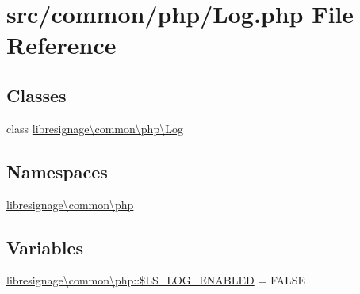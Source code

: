 \hypertarget{Log_8php}{}\section{src/common/php/\+Log.php File Reference}
\label{Log_8php}
\subsection*{Classes}
\begin{DoxyCompactItemize}
\item 
class \hyperlink{classlibresignage_1_1common_1_1php_1_1Log}{libresignage\textbackslash{}common\textbackslash{}php\textbackslash{}\+Log}
\end{DoxyCompactItemize}
\subsection*{Namespaces}
\begin{DoxyCompactItemize}
\item 
 \hyperlink{namespacelibresignage_1_1common_1_1php}{libresignage\textbackslash{}common\textbackslash{}php}
\end{DoxyCompactItemize}
\subsection*{Variables}
\begin{DoxyCompactItemize}
\item 
\hyperlink{namespacelibresignage_1_1common_1_1php_ae62a3a93ad8436552b28e6bda401439a}{libresignage\textbackslash{}common\textbackslash{}php\+::\$\+L\+S\+\_\+\+L\+O\+G\+\_\+\+E\+N\+A\+B\+L\+ED} = F\+A\+L\+SE
\end{DoxyCompactItemize}

